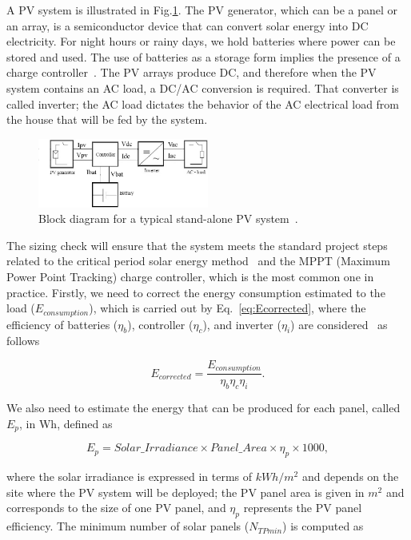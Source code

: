\documentclass[runningheads]{llncs}
\begin{document}
A PV system is illustrated in Fig.\ref{fig:blockdiagram}. 
The PV generator, which can be a panel or an array, is a semiconductor device that can convert solar energy into DC electricity. 
For night hours or rainy days, we hold batteries where power can be stored and used. The use of batteries as a storage form implies the presence of a charge controller~\cite{Hansen}. The PV arrays produce DC, and therefore when the PV system contains an AC load, a DC/AC conversion is required. That converter is called inverter; the AC load dictates the behavior of the AC electrical load from the house that will be fed by the system.

\begin{figure}
\includegraphics[width=0.5\textwidth]{blockdiagramPVS2_rev}
\centering
\caption{Block diagram for a typical stand-alone PV system~\cite{Hansen}.}
\label{fig:blockdiagram} 
\end{figure}

The sizing check will ensure that the system meets the standard project steps related to the critical period solar energy method~\cite{Pinho} and the MPPT (Maximum Power Point Tracking) charge controller, which is the most common one in practice. Firstly, we need to correct the energy consumption estimated to the load ($E_{consumption}$), which is carried out by Eq.~\ref{eq:Ecorrected}, where the efficiency of batteries ($\eta_{b}$), controller ($\eta_{c}$), and inverter ($\eta_{i}$) are considered~\cite{Pinho} as follows

\begin{equation}
\label{eq:Ecorrected}
E_{corrected} = \frac {E_{consumption}}{\eta_{b} \eta_{c} \eta_{i} }.
\end{equation}

We also need to estimate the energy that can be produced for each panel, called $E_{p}$, in Wh, defined as

\begin{equation}
\label{eq:Ep}
E_{p} = Solar\_Irradiance \times Panel\_Area \times \eta_{p} \times 1000,
\end{equation}

\noindent where the solar irradiance is expressed in terms of $kWh/m^{2}$ and depends on the site where the PV system will be deployed; 
the PV panel area is given in $m^{2}$ and corresponds to the size of one PV panel, and $\eta_{p}$ represents the PV panel efficiency.
The minimum number of solar panels ($N_{TPmin}$) is computed as
\end{document}

